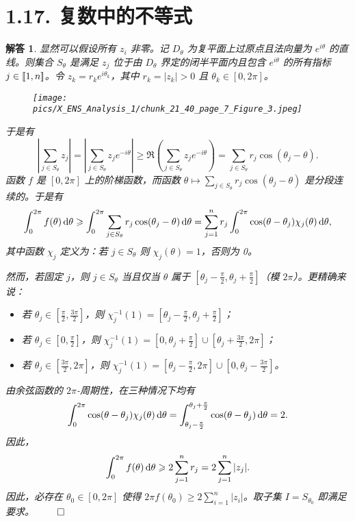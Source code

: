 \documentclass[12pt,UTF8]{ctexbook}
\theoremstyle{exercisestyle}
\theoremstyle{solutionstyle}
\newtheorem*{solution*}{解答}
\newenvironment{solution}
  {\begin{solution*}}
  {\hfill\ensuremath{\qed}\end{solution*}}
\begin{document}
\section{1.17. 复数中的不等式}
\begin{solution}
显然可以假设所有 \( z_i \) 非零。记 \( D_{\theta} \) 为复平面上过原点且法向量为 \( e^{i\theta} \) 的直线。则集合 \( S_{\theta} \) 是满足 \( z_j \) 位于由 \( D_{\theta} \) 界定的闭半平面内且包含 \( e^{i\theta} \) 的所有指标 \( j \in [\![1,n]\!] \)。令 \( z_k = r_k e^{i\theta_k} \)，其中 \( r_k = |z_k| > 0 \) 且 \( \theta_k \in [0, 2\pi] \)。
\begin{figure}[htbp]
    \centering
    \texttt{[image: pics/X\_ENS\_Analysis\_1/chunk\_21\_40\_page\_7\_Figure\_3.jpeg]}
\end{figure}
于是有
\[
\left| \sum_{j \in S_{\theta}} z_j \right| = \left| \sum_{j \in S_{\theta}} z_j e^{-i\theta} \right| \geqslant \Re \left( \sum_{j \in S_{\theta}} z_j e^{-i\theta} \right) = \sum_{j \in S_{\theta}} r_j \cos(\theta_j - \theta).
\]
函数 \( f \) 是 \([0, 2\pi]\) 上的阶梯函数，而函数 \(\theta \mapsto \sum_{j \in S_{\theta}} r_j \cos(\theta_j - \theta)\) 是分段连续的。于是有
\[
\int_0^{2\pi} f(\theta) \,\mathrm{d}\theta \geqslant \int_0^{2\pi} \sum_{j \in S_{\theta}} r_j \cos(\theta_j - \theta) \,\mathrm{d}\theta = \sum_{j=1}^n r_j \int_0^{2\pi} \cos(\theta - \theta_j) \chi_j(\theta) \,\mathrm{d}\theta,
\]
其中函数 \(\chi_j\) 定义为：若 \( j \in S_\theta \) 则 \(\chi_j(\theta) = 1\)，否则为 0。

然而，若固定 \( j \)，则 \( j \in S_\theta \) 当且仅当 \(\theta\) 属于 \(\left[\theta_j - \frac{\pi}{2}, \theta_j + \frac{\pi}{2}\right]\)（模 \(2\pi\)）。更精确来说：
\begin{itemize}
    \item 若 \(\theta_j \in \left[\frac{\pi}{2}, \frac{3\pi}{2}\right]\)，则 \(\chi_j^{-1}(1) = \left[\theta_j - \frac{\pi}{2}, \theta_j + \frac{\pi}{2}\right]\)；
    \item 若 \(\theta_j \in \left[0, \frac{\pi}{2}\right]\)，则 \(\chi_j^{-1}(1) = \left[0, \theta_j + \frac{\pi}{2}\right] \cup \left[\theta_j + \frac{3\pi}{2}, 2\pi\right]\)；
    \item 若 \(\theta_j \in \left[\frac{3\pi}{2}, 2\pi\right]\)，则 \(\chi_j^{-1}(1) = \left[\theta_j - \frac{\pi}{2}, 2\pi\right] \cup \left[0, \theta_j - \frac{3\pi}{2}\right]\)。
\end{itemize}

由余弦函数的 \(2\pi\)-周期性，在三种情况下均有
\[
\int_0^{2\pi} \cos(\theta - \theta_j) \chi_j(\theta) \,\mathrm{d}\theta = \int_{\theta_j - \frac{\pi}{2}}^{\theta_j + \frac{\pi}{2}} \cos(\theta - \theta_j) \,\mathrm{d}\theta = 2.
\]
因此，
\[
\int_0^{2\pi} f(\theta) \,\mathrm{d}\theta \geqslant 2 \sum_{j=1}^n r_j = 2 \sum_{j=1}^n |z_j|.
\]
因此，必存在 \(\theta_0 \in [0, 2\pi]\) 使得 \( 2\pi f(\theta_0) \geqslant 2 \sum_{i=1}^n |z_i| \)。取子集 \( I = S_{\theta_0} \) 即满足要求。
\end{solution}
\end{document}
